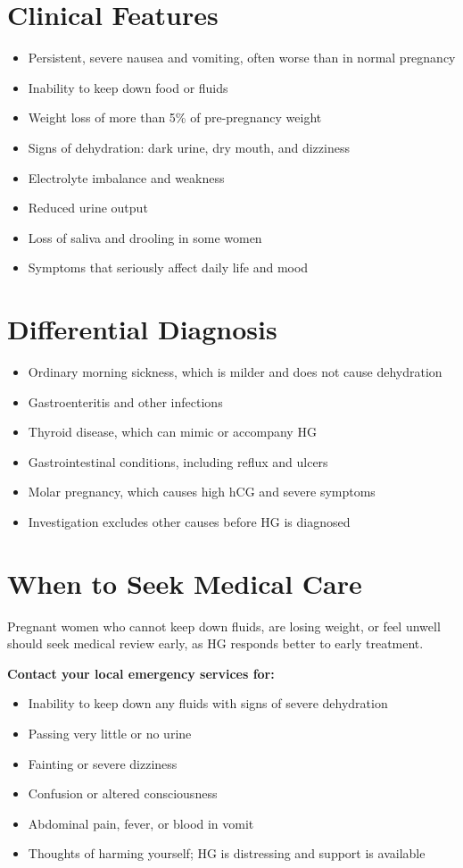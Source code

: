\section*{Clinical Features}
\begin{itemize}
    \item Persistent, severe nausea and vomiting, often worse than in normal pregnancy
    \item Inability to keep down food or fluids
    \item Weight loss of more than 5\% of pre-pregnancy weight
    \item Signs of dehydration: dark urine, dry mouth, and dizziness
    \item Electrolyte imbalance and weakness
    \item Reduced urine output
    \item Loss of saliva and drooling in some women
    \item Symptoms that seriously affect daily life and mood
\end{itemize}

\section*{Differential Diagnosis}
\begin{itemize}
    \item Ordinary morning sickness, which is milder and does not cause dehydration
    \item Gastroenteritis and other infections
    \item Thyroid disease, which can mimic or accompany HG
    \item Gastrointestinal conditions, including reflux and ulcers
    \item Molar pregnancy, which causes high hCG and severe symptoms
    \item Investigation excludes other causes before HG is diagnosed
\end{itemize}

\section*{When to Seek Medical Care}
Pregnant women who cannot keep down fluids, are losing weight, or feel unwell should seek medical review early, as HG responds better to early treatment.

\textbf{Contact your local emergency services for:}
\begin{itemize}
    \item Inability to keep down any fluids with signs of severe dehydration
    \item Passing very little or no urine
    \item Fainting or severe dizziness
    \item Confusion or altered consciousness
    \item Abdominal pain, fever, or blood in vomit
    \item Thoughts of harming yourself; HG is distressing and support is available
\end{itemize}

